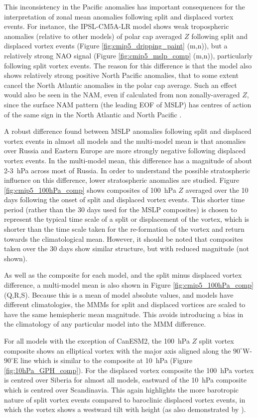 This inconsistency in the Pacific anomalies has important consequences for the
interpretation of zonal mean anomalies following split and displaced vortex
events. For instance, the IPSL-CM5A-LR model shows weak tropospheric anomalies
(relative to other models) of polar cap averaged $Z$ following split and
displaced vortex events (Figure \ref{fig:cmip5_dripping_paint} (m,n)), but a
relatively strong NAO signal (Figure \ref{fig:cmip5_mslp_comp} (m,n)),
particularly following split vortex events. The reason for this difference is
that the model also shows relatively strong positive North Pacific anomalies,
that to some extent cancel the North Atlantic anomalies in the polar cap
average. Such an effect would also be seen in the NAM, even if calculated from
non zonally-averaged $Z$, since the surface NAM pattern (the leading EOF of
MSLP) has centres of action of the same sign in the North Atlantic and North
Pacific \citep[e.g.,][]{Ambaum2001}.

A robust difference found between MSLP anomalies following split and displaced
vortex events in almost all models and the multi-model mean is that anomalies
over Russia and Eastern Europe are more strongly negative following displaced
vortex events. In the multi-model mean, this difference has a magnitude of about
2-3~hPa across most of Russia. In order to understand the possible stratospheric
influence on this difference, lower stratospheric anomalies are studied. Figure
\ref{fig:cmip5_100hPa_comp} shows composites of 100~hPa $Z$ averaged over the 10
days following the onset of split and displaced vortex events. This shorter time
period (rather than the 30 days used for the MSLP composites) is chosen to
represent the typical time scale of a split or displacement of the vortex, which
is shorter than the time scale taken for the re-formation of the vortex and
return towards the climatological mean. However, it should be noted that
composites taken over the 30 days show similar structure, but with reduced
magnitude (not shown). 

As well as the composite for each model, and the split minus displaced vortex
difference, a multi-model mean is also shown in Figure
\ref{fig:cmip5_100hPa_comp} (Q,R,S). Because this is a mean of model absolute
values, and models have different climatologies, the MMMs for split and
displaced vortices are scaled to have the same hemispheric mean magnitude. This
avoids introducing a bias in the climatology of any particular model into the
MMM difference. 

For all models with the exception of CanESM2, the 100~hPa $Z$ split vortex
composite shows an elliptical vortex with the major axis aligned along the
$90^{\circ}$W-$90^{\circ}$E line which is similar to the composite at 10~hPa
(Figure \ref{fig:10hPa_GPH_comp}). For the displaced vortex composite the
100~hPa vortex is centred over Siberia for almost all models, eastward of the
10~hPa composite which is centred over Scandinavia. This again highlights the
more barotropic nature of split vortex events compared to baroclinic displaced
vortex events, in which the vortex shows a westward tilt with height (as also
demonstrated by \citet{Matthewman2009}).

